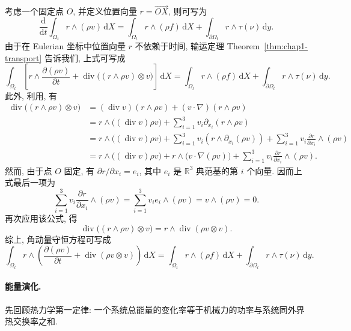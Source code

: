 考虑一个固定点 $O$, 并定义位置向量 $r=\overrightarrow{OX}$, 则可写为
\[
  \frac{\mathrm{d}}{\mathrm{d}t}\int_{\Omega_t}r\wedge(\rho v)\,\mathrm{d}X
  =\int_{\Omega_t}r\wedge(\rho f)\,\mathrm{d}X
  +\int_{\partial\Omega_t}r\wedge\tau(\nu)\,\mathrm{d}y.
\]
由于在 Eulerian 坐标中位置向量 $r$ 不依赖于时间, 输运定理 Theorem~\ref{thm:chap1-transport} 告诉我们, 上式可写成
\[
  \int_{\Omega_t}\left[r\wedge\frac{\partial(\rho v)}{\partial t}
  +\operatorname{div}\bigl((r\wedge\rho v)\otimes v\bigr)\right]\,\mathrm{d}X
  =\int_{\Omega_t}r\wedge(\rho f)\,\mathrm{d}X
  +\int_{\partial\Omega_t}r\wedge\tau(\nu)\,\mathrm{d}y.
\]
此外, 利用, 有
\begin{align*}
\operatorname{div}\bigl((r\wedge\rho v)\otimes v\bigr)
&=(\operatorname{div}v)(r\wedge\rho v)+(v\cdot\nabla)(r\wedge\rho v)\\
&=r\wedge\bigl((\operatorname{div}v)\rho v\bigr)+\sum_{i=1}^3v_i\partial_{x_i}(r\wedge\rho v)\\
&=r\wedge\bigl((\operatorname{div}v)\rho v\bigr)+\sum_{i=1}^3v_i(r\wedge\partial_{x_i}(\rho v))
 +\sum_{i=1}^3v_i\frac{\partial r}{\partial x_i}\wedge(\rho v)\\
&=r\wedge\bigl((\operatorname{div}v)\rho v\bigr)+r\wedge\bigl(v\cdot\nabla(\rho v)\bigr)
 +\sum_{i=1}^3v_i\frac{\partial r}{\partial x_i}\wedge(\rho v).
\end{align*}
然而, 由于点 $O$ 固定, 有 $\partial r/\partial x_i=e_i$, 其中 $e_i$ 是 $\mathbb{R}^3$ 典范基的第 $i$ 个向量. 因而上式最后一项为
\[
  \sum_{i=1}^3v_i\frac{\partial r}{\partial x_i}\wedge(\rho v)
  =\sum_{i=1}^3v_i e_i\wedge(\rho v)=v\wedge(\rho v)=0.
\]
再次应用该公式, 得
\[
  \operatorname{div}\bigl((r\wedge\rho v)\otimes v\bigr)=r\wedge\operatorname{div}(\rho v\otimes v).
\]
综上, 角动量守恒方程可写成
\begin{equation}
\label{eq:chap1-angular-momentum-integral}
  \int_{\Omega_t}r\wedge\left(\frac{\partial(\rho v)}{\partial t}+\operatorname{div}(\rho v\otimes v)\right)\,\mathrm{d}X
  =\int_{\Omega_t}r\wedge(\rho f)\,\mathrm{d}X
  +\int_{\partial\Omega_t}r\wedge\tau(\nu)\,\mathrm{d}y.
\end{equation}

\paragraph{能量演化.}
\label{subsec:chap1-energy-evolution}

先回顾热力学第一定律: 一个系统总能量的变化率等于机械力的功率与系统同外界热交换率之和.

